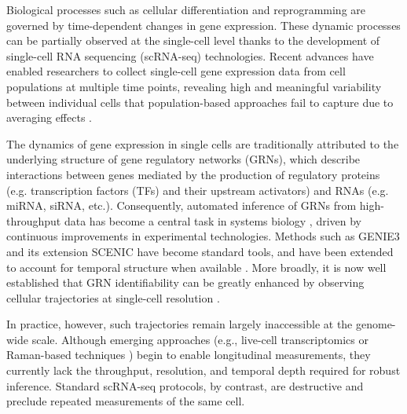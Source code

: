 \documentclass[a4paper, 11pt]{article}
\theoremstyle{plain}
\theoremstyle{remark}
\begin{document}
Biological processes such as cellular differentiation and reprogramming are governed by time-dependent changes in gene expression. These dynamic processes can be partially observed at the single-cell level thanks to the development of single-cell RNA sequencing (scRNA-seq) technologies. Recent advances have enabled researchers to collect single-cell gene expression data from cell populations at multiple time points, revealing high and meaningful variability between individual cells \cite{Mojtahedi_2016, Richard_2016, Semrau_2017, Stumpf_2016} that population-based approaches fail to capture due to averaging effects \cite{Mar_2019, Coskun_2016}.

The dynamics of gene expression in single cells are traditionally attributed to the underlying structure of gene regulatory networks (GRNs), which describe interactions between genes mediated by the production of regulatory proteins (e.g. transcription factors (TFs) and their upstream activators) and RNAs (e.g. miRNA, siRNA, etc.). Consequently, automated inference of GRNs from high-throughput data has become a central task in systems biology \cite{sanguinetti2019gene}, driven by continuous improvements in experimental technologies. Methods such as GENIE3 \cite{huynh2010inferring} and its extension SCENIC \cite{aibar2017scenic} have become standard tools, and have been extended to account for temporal structure when available \cite{huynh2018dyngenie3}. More broadly, it is now well established that GRN identifiability can be greatly enhanced by observing cellular trajectories at single-cell resolution \cite{qiu2020inferring}.

In practice, however, such trajectories remain largely inaccessible at the genome-wide scale. Although emerging approaches (e.g., live-cell transcriptomics or Raman-based techniques \cite{chen2022live, kobayashi2024prediction}) begin to enable longitudinal measurements, they currently lack the throughput, resolution, and temporal depth required for robust inference. Standard scRNA-seq protocols, by contrast, are destructive and preclude repeated measurements of the same cell.
\end{document}
